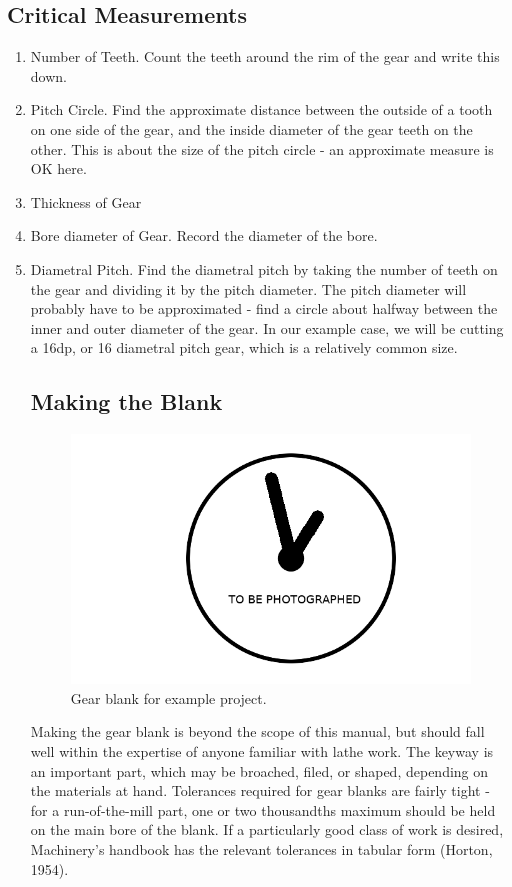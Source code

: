\documentclass[12pt,twoside,letterpaper]{article}
\begin{document}
\subsection{Critical Measurements}
\begin{enumerate}
\item Number of Teeth. Count the teeth around the rim of the gear and write this down.
\item Pitch Circle. Find the approximate distance between the outside of a tooth on one side of the gear, and the inside diameter of the gear teeth on the other. This is about the size of the pitch circle - an approximate measure is OK here.
\item Thickness of Gear
\item Bore diameter of Gear. Record the diameter of the bore.
\item Diametral Pitch. Find the diametral pitch by taking the number of teeth on the gear and dividing it by the pitch diameter. The pitch diameter will probably have to be approximated - find a circle about halfway between the inner and outer diameter of the gear. In our example case, we will be cutting a 16dp, or 16 diametral pitch gear, which is a relatively common size.


\subsection{Making the Blank}
\begin{figure}[H]
\centering
\includegraphics[width=5in]{imgpending}
	\caption{Gear blank for example project.}
\end{figure}
		Making the gear blank is beyond the scope of this manual, but should fall well within the expertise of anyone familiar with lathe work. The keyway is an important part, which may be broached, filed, or shaped, depending on the materials at hand. Tolerances required for gear blanks are fairly tight - for a run-of-the-mill part, one or two thousandths maximum should be held on the main bore of the blank. If a particularly good class of work is desired, Machinery's handbook has the relevant tolerances in tabular form (Horton, 1954).

\end{enumerate}
\end{document}
